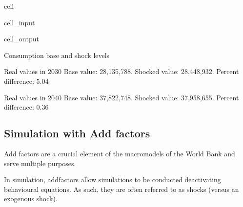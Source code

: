 \documentclass[letterpaper,10pt,english]{jupyterBook}
\begin{document}
\begin{sphinxuseclass}{cell}
\begin{sphinxVerbatimInput}
\begin{sphinxuseclass}{cell_input}
\begin{sphinxVerbatim}[commandchars=\\\{\}]
    \PYG{p}{[}\PYG{p}{]}\PYG{p}{[}\PYG{p}{]}\PYG{p}{[}\PYG{p}{]}
\end{sphinxVerbatim}

\end{sphinxuseclass}\end{sphinxVerbatimInput}
\begin{sphinxVerbatimOutput}

\begin{sphinxuseclass}{cell_output}
\begin{sphinxVerbatim}[commandchars=\\\{\}]
Consumption base and shock levels

Real values in 2030
Base value:  28,135,788.	Shocked value: 28,448,932.
Percent difference: 5.04

Real values in 2040
Base value:  37,822,748.	Shocked value: 37,958,655.
Percent difference: 0.36
\end{sphinxVerbatim}

\end{sphinxuseclass}\end{sphinxVerbatimOutput}

\end{sphinxuseclass}

\subsection{Simulation with Add factors}
\label{\detokenize{content/06_WBModels/LoadingWBModel:simulation-with-add-factors}}
\sphinxAtStartPar
Add factors are a crucial element of the macromodels of the World Bank and serve multiple purposes.

\sphinxAtStartPar
In simulation, add\sphinxhyphen{}factors allow simulations to be conducted  de\sphinxhyphen{}activating behavioural equations.  As such, they are often referred to as  shocks (versus an exogenous shock).
\end{document}
